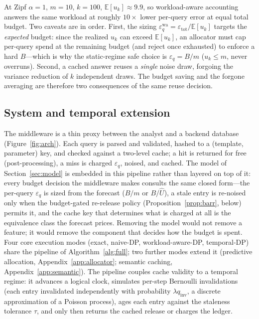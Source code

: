 \documentclass[sigconf,nonacm]{acmart}
\newcommand{\eps}{\varepsilon}
\newcommand{\E}{\mathbb{E}}
\begin{document}
\noindent At Zipf $\alpha{=}1$, $m{=}10$, $k{=}100$, $\E[u_k]\approx9.9$, so workload-aware accounting answers the same workload at roughly $10\times$ lower per-query error at equal total budget. Two caveats are in order. First, the sizing $\eps_q^{\mathrm{wa}}=\eps_{\mathrm{tot}}/\E[u_k]$ targets the \emph{expected} budget: since the realized $u_k$ can exceed $\E[u_k]$, an allocator must cap per-query spend at the remaining budget (and reject once exhausted) to enforce a hard $B$---which is why the static-regime safe choice is $\eps_q=B/m$ ($u_k\le m$, never overruns). Second, a cached answer reuses a \emph{single} noise draw, forgoing the variance reduction of $k$ independent draws. The budget saving and the forgone averaging are therefore two consequences of the same reuse decision.

\subsection{System and temporal extension}
\label{sec:system}

The middleware is a thin proxy between the analyst and a backend database (Figure~\ref{fig:arch}). Each query is parsed and validated, hashed to a (template, parameter) key, and checked against a two-level cache; a hit is returned for free (post-processing), a miss is charged $\eps_q$, noised, and cached. The model of Section~\ref{sec:model} is embedded in this pipeline rather than layered on top of it: every budget decision the middleware makes consults the same closed form---the per-query $\eps_q$ is sized from the forecast ($B/m$ or $B/\hat U$), a stale entry is re-noised only when the budget-gated re-release policy (Proposition~\ref{prop:barr}, below) permits it, and the cache key that determines what is charged at all is the equivalence class the forecast prices. Removing the model would not remove a feature; it would remove the component that decides how the budget is spent. Four core execution modes (exact, naive-DP, workload-aware-DP, temporal-DP) share the pipeline of Algorithm~\ref{alg:full}; two further modes extend it (predictive allocation, Appendix~\ref{app:allocator}; semantic caching, Appendix~\ref{app:semantic}). The pipeline couples cache validity to a temporal regime: it advances a logical clock, simulates per-step Bernoulli invalidations (each entry invalidated independently with probability $\lambda q_{\mathrm{inv}}$, a discrete approximation of a Poisson process), ages each entry against the staleness tolerance $\tau$, and only then returns the cached release or charges the ledger.
\end{document}
